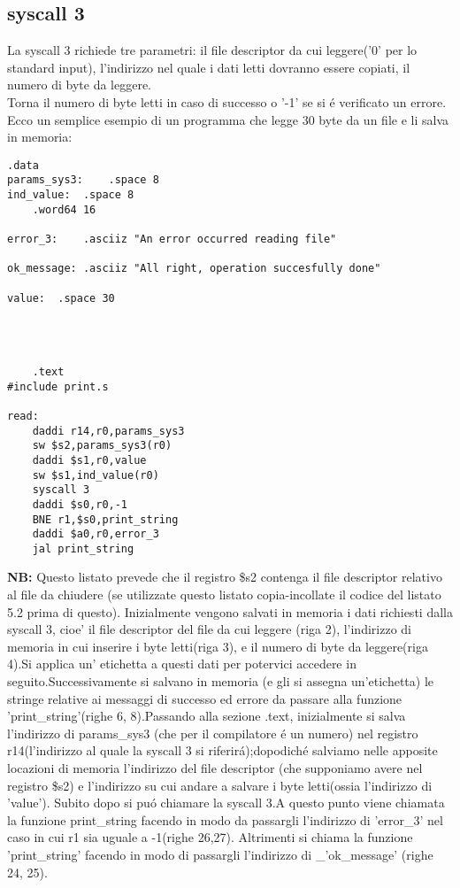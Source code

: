 \documentclass[12pt]{report}
\newcommand{\OF}{\textbf{NB:} Questo listato prevede che il registro \$s2 contenga il file descriptor
relativo al file da chiudere (se utilizzate questo listato copia-incollate il codice del listato 5.2 prima di questo).}
\begin{document}
\subsection{syscall 3}
La syscall 3 richiede tre parametri: il file descriptor da cui leggere('0' per lo standard input), 
l’indirizzo nel quale i dati letti dovranno essere copiati, il numero di byte da leggere.\\
Torna il numero di byte letti in caso di successo o '-1' se si \'{e} verificato un errore.\\ 
Ecco un semplice esempio di un programma che legge 30 byte da un file e li salva in memoria:
\begin{lstlisting}[caption={syscall3}, label={code:syscall3}, style={mips}]
      		.data
params_sys3:	.space 8				
ind_value:	.space 8			
	.word64 16		

error_3:	.asciiz "An error occurred reading file"	

ok_message:	.asciiz "All right, operation succesfully done"	

value:	.space 30					

			


	.text
#include print.s	

read:
	daddi r14,r0,params_sys3	
	sw $s2,params_sys3(r0)
	daddi $s1,r0,value			
	sw $s1,ind_value(r0)			
	syscall 3			
	daddi $s0,r0,-1			
	BNE r1,$s0,print_string	
	daddi $a0,r0,error_3
	jal print_string
\end{lstlisting}
\OF{}
Inizialmente vengono salvati in memoria i dati richiesti dalla syscall 3, cioe' il file descriptor del file da cui leggere (riga 2), 
l'indirizzo di memoria in cui inserire i byte letti(riga 3), e il numero di byte da leggere(riga 4).Si applica un' etichetta
 a questi dati per potervici accedere in seguito.Successivamente si salvano in memoria (e gli si assegna un'etichetta) le stringe relative ai messaggi 
di successo ed errore da passare alla funzione 'print\_string'(righe 6, 8).Passando alla sezione .text, inizialmente si salva l'indirizzo di params\_sys3
(che per il compilatore \'{e} un numero) nel registro r14(l'indirizzo al quale la syscall 3 si riferir\'{a});dopodich\'{e} salviamo nelle apposite locazioni 
di memoria l'indirizzo del file descriptor (che supponiamo avere nel registro \$s2) e l'indirizzo su cui andare a salvare i byte letti(ossia l'indirizzo di 'value').
Subito dopo si pu\'{o} chiamare la syscall 3.A questo  punto viene chiamata la funzione print\_string facendo in modo da passargli l'indirizzo di 'error\_3'
 nel caso in cui r1 sia uguale a -1(righe 26,27). Altrimenti si chiama la funzione 'print\_string' facendo in modo di passargli l'indirizzo di \_'ok\_message' (righe 24, 25).
\end{document}
